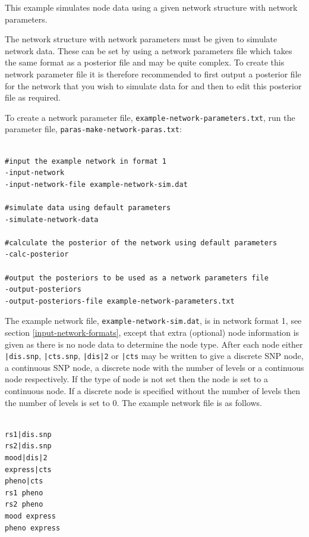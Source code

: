 \documentclass[a4paper,12pt]{article}
\newcommand{\code}[1]{{\footnotesize{{\tt #1}}}}
\begin{document}
This example simulates node data using a given network structure with network parameters. 

The network structure with network parameters must be given to simulate network data. These can be set by using a network parameters file which takes the same format as a posterior file and may be quite complex. To create this network parameter file it is therefore recommended to first output a posterior file for the network that you wish to simulate data for and then to edit this posterior file as required. 

To create a network parameter file, \code{example-network-parameters.txt}, run the parameter file, \code{paras-make-network-paras.txt}: 
\vspace{0.35cm} \begin{lstlisting}

#input the example network in format 1
-input-network
-input-network-file example-network-sim.dat

#simulate data using default parameters
-simulate-network-data

#calculate the posterior of the network using default parameters
-calc-posterior

#output the posteriors to be used as a network parameters file
-output-posteriors
-output-posteriors-file example-network-parameters.txt

\end{lstlisting} \vspace{0.35cm}
The example network file, \code{example-network-sim.dat}, is in network format 1, see  section \ref{input-network-formats}, except that extra (optional) node information is given as there is no node data to determine the node type. After each node either \code{|dis.snp}, \code{|cts.snp}, \code{|dis|2} or \code{|cts} may be written to give a discrete SNP node, a continuous SNP node, a discrete node with the number of levels or a continuous node respectively. If the type of node is not set then the node is set to a continuous node. If a discrete node is specified without the number of levels then the number of levels is set to 0. The example network file is as follows. 
\vspace{0.35cm} \begin{lstlisting}

rs1|dis.snp
rs2|dis.snp
mood|dis|2
express|cts
pheno|cts
rs1 pheno
rs2 pheno
mood express
pheno express

\end{lstlisting} \vspace{0.35cm}
\end{document}
